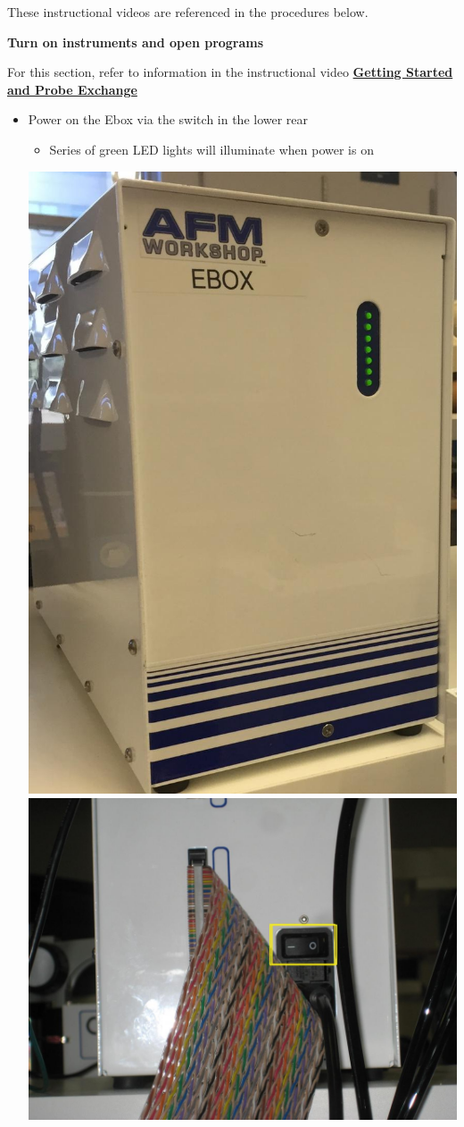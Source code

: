 \documentclass{../lab}
\begin{document}
These instructional videos are referenced in the procedures below.

\textbf{Turn on instruments and open programs}

For this section, refer to information in the instructional video  \href{http://experimentationlab.berkeley.edu/sites/default/files/gettingstarted\_final2.mp4}{\textbf{Getting Started and Probe Exchange}}

\begin{itemize}
    \item Power on the Ebox via the switch in the lower rear
    \begin{itemize}
        \item Series of green LED lights will illuminate when power is on
    \end{itemize}
    \begin{center}
    \href{http://experimentationlab.berkeley.edu/sites/default/files/EBOX2.jpg}{\includegraphics[width=0.33\linewidth,keepaspectratio]{images/EBOX2.jpg}}
    \href{http://experimentationlab.berkeley.edu/sites/default/files/AFMImages/10.JPG}{\includegraphics[width=0.33\linewidth,keepaspectratio]{images/10.JPG}}
    \end{center}


\end{itemize}
\end{document}
